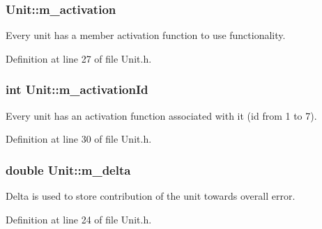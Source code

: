 \subsubsection[{\texorpdfstring{m\+\_\+activation}{m_activation}}]{ Unit\+::m\+\_\+activation\hspace{0.3cm}{\ttfamily [private]}}\hypertarget{classUnit_a91c559e1e32ca2beb316d315943845e0}{}\label{classUnit_a91c559e1e32ca2beb316d315943845e0}


Every unit has a member activation function to use functionality. 



Definition at line 27 of file Unit.\+h.

\subsubsection[{\texorpdfstring{m\+\_\+activation\+Id}{m_activationId}}]{\setlength{\rightskip}{0pt plus 5cm}int Unit\+::m\+\_\+activation\+Id\hspace{0.3cm}{\ttfamily [private]}}\hypertarget{classUnit_a20a0aafb8a4a19a09636f15ebdbbda9a}{}\label{classUnit_a20a0aafb8a4a19a09636f15ebdbbda9a}


Every unit has an activation function associated with it (id from 1 to 7). 



Definition at line 30 of file Unit.\+h.

\subsubsection[{\texorpdfstring{m\+\_\+delta}{m_delta}}]{\setlength{\rightskip}{0pt plus 5cm}double Unit\+::m\+\_\+delta\hspace{0.3cm}{\ttfamily [private]}}\hypertarget{classUnit_ad76aecbc14a56812e250991a2db4a176}{}\label{classUnit_ad76aecbc14a56812e250991a2db4a176}


Delta is used to store contribution of the unit towards overall error. 



Definition at line 24 of file Unit.\+h.

